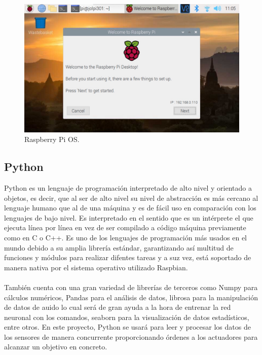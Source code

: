 \begin{figure}[H]
  \centering
  \includegraphics[scale=0.3]{figs/raspbian} %
  \caption{Raspberry Pi OS.}
  \label{fig:raspbian}
\end{figure}


\subsection{Python}
\label{subsec:python}

Python es un lenguaje de programación interpretado de alto nivel y orientado a objetos, es decir, que al ser de alto nivel su nivel de abstracción es más cercano al lenguaje humano que al de una máquina y es de fácil uso en comparación con los lenguajes de bajo nivel. Es interpretado en el sentido que es un intérprete el que ejecuta línea por línea en vez de ser compilado a código máquina previamente como en C o C++. Es uno de los lenguajes de programación más usados en el mundo debido a su amplia librería estándar, garantizando así multitud de funciones y módulos para realizar difentes tareas y a suz vez, está soportado de manera nativa por el sistema operativo utilizado Raspbian.\\ \\ También cuenta con una gran variedad de librerías de terceros como Numpy para cálculos numéricos, Pandas para el análisis de datos, librosa para la manipulación de datos de auido lo cual será de gran ayuda a la hora de entrenar la red neuronal con los comandos, seaborn para la visualización de datos estadísticos, entre otros. En este proyecto, Python se usará para leer y procesar los datos de los sensores de manera concurrente proporcionando órdenes a los actuadores para alcanzar un objetivo en concreto.



